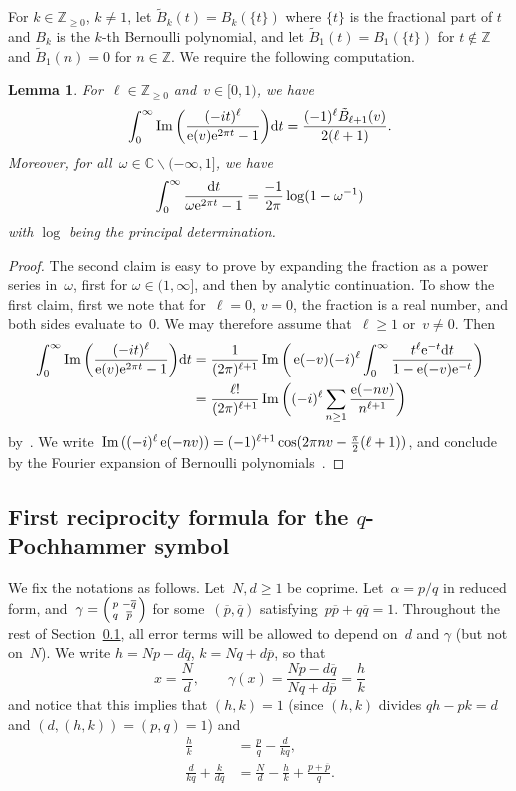 \documentclass[11pt]{amsart}
\newcommand{\C}{\mathbb{C}}
\newcommand{\Z}{\mathbb{Z}}
\newtheorem{lemma}{Lemma}
\theoremstyle{definition}
\newcommand{\pr}[1]{\mathchoice{\left( #1\right)}{(#1)}{(#1)}{(#1)}}
\newcommand{\e}[1][]{\ifthenelse{\equal{#1}{}}{{\rm e}}{\operatorname{e}\pr{ #1}}}
\newcommand{\df}{\mathrm{d}}
\renewcommand\Im{\operatorname{Im}}
\newcommand\minus{\smallsetminus}
\newcommand{\1}{{\mathbf 1}}
\renewcommand{\bar}[1]{\overline{#1}}
\let\originalleft\left
\let\originalright\right
\renewcommand{\left}{\mathopen{}\mathclose\bgroup\originalleft}
\renewcommand{\right}{\aftergroup\egroup\originalright}
\numberwithin{equation}{section}
\begin{document}
For $k\in\Z_{\geq 0}$, $k\neq 1$, let $\tilde B_{k}(t)= {B}_{k}(\{t\})$ where $\{t\}$ is the fractional part of $t$ and ${B}_{k}$ is the $k$-th Bernoulli polynomial, and let $\tilde B_{1}(t)={B}_1(\{t\})$ for $t\notin\Z$ and $\tilde B_1(n)=0$ for $n\in\Z$.
We require the following computation. 
\begin{lemma}\label{lem:B-integral}
  For~$\ell\in\Z_{\geq0}$ and~$v\in[0, 1)$, we have
  $$ \int_{0}^\infty \Im\bigg( \frac{(-it)^\ell}{\e[v] \e^{2\pi t}-1}\bigg) \df t=  \frac{(-1)^\ell \tilde B_{\ell+1}(v)}{2(\ell+1)}. $$
  Moreover, for all~$\omega\in\C\minus(-\infty, 1]$, we have
  $$ \int_0^\infty \frac{\df t}{\omega  \e^{2\pi t}-1} = \frac{-1}{2\pi}\log(1-\omega^{-1})  $$
  with $\log$ being the principal determination.
\end{lemma}
\begin{proof}
  The second claim is easy to prove by expanding the fraction as a power series in~$\omega$, first for $\omega\in(1,\infty]$, and then by analytic continuation. To show the first claim, first we note that for~$\ell=0$, $v=0$, the fraction is a real number, and both sides evaluate to~$0$. We may therefore assume that~$\ell\geq 1$ or~$v\neq 0$. Then
  \begin{align*}
    \int_{0}^\infty \Im \bigg(\frac{(-it)^\ell}{\e[v] \e^{2\pi t}-1}\bigg)\df t = {}& \frac{1}{(2\pi)^{\ell+1}}\Im\bigg( \e[-v] (-i)^\ell \int_{0}^\infty \frac{t^\ell \e^{-t}\df t}{1-\e[-v] \e^{-t}}\bigg) \\
    = {}& \frac{\ell!}{(2\pi)^{\ell+1}}\Im{}\bigg( (-i)^\ell \sum_{n\geq 1}\frac{\e[-nv]}{n^{\ell+1}}\bigg)
  \end{align*}
  by~\cite[eq. (3.411.6)]{GZ}. We write~$\Im{}( (-i)^\ell\e[-nv] )= (-1)^{\ell+1} \cos(2\pi nv - \frac\pi2(\ell+1))$, and conclude by the Fourier expansion of Bernoulli polynomials~\cite[eq. (9.622.1)]{GZ}.
\end{proof}


\subsection{First reciprocity formula for the $q$-Pochhammer symbol}\label{ss:1rf}


We fix the notations as follows. Let~$N, d\geq 1$ be coprime. Let~$\alpha = p/q$ in reduced form, and~$\gamma = \left( \begin{smallmatrix} p & -\bar{q} \\ q & \bar{p} \end{smallmatrix} \right)$ for some~$(\bar{p}, \bar{q})$ satisfying~$p\bar{p} + q\bar{q} = 1$. Throughout the rest of Section~\ref{ss:1rf}, all error terms will be allowed to depend on~$d$ and $\gamma$ (but not on~$N$).
We write $h=Np-d\bar{q}$, $k=Nq+d\bar{p}$, so that
$$ x = \frac Nd, \qquad \gamma(x) = \frac{Np-d\bar{q}}{Nq+d\bar{p}} = \frac hk $$
and notice that this implies that $(h,k)=1$ (since $(h,k)$ divides $qh-pk=d$ and $(d,(h,k))=(p,q)=1$) and
\begin{align}
  \frac{h}{k}&=\frac{p}{q}-\frac{d}{kq},\label{redeq}\\
  \frac{d}{ kq}+\frac{k}{dq}&=\frac{N}{d}-\frac{h}k+\frac{p+\overline p}q.\label{expid}
\end{align}
\end{document}
